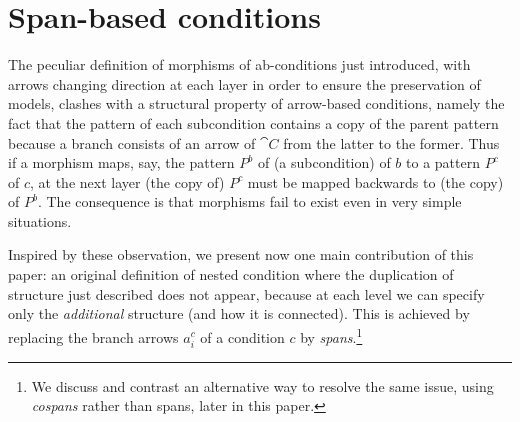 \section{Span-based conditions}

The peculiar definition of morphisms of ab-conditions just introduced, with arrows changing direction at each layer in order to ensure the preservation of models, clashes with a structural property of arrow-based conditions, namely the fact that the pattern of each subcondition contains a copy of the parent pattern because a branch consists of an arrow of $\cat{C}$ from the latter to the former. Thus if a morphism maps, say, the pattern $P^b$ of (a subcondition) of $b$ to a pattern $P^c$ of $c$, at the next layer (the copy of) $P^c$ must be mapped backwards to (the copy) of $P^b$. The consequence is that morphisms fail to exist even in very simple situations.
  
Inspired by these observation, we present now one main contribution of this paper: an original definition of nested condition where the duplication of structure just described does not appear, because at each level we can specify only the \emph{additional} structure (and how it is connected). This is achieved by replacing the branch arrows $a^c_i$ of a condition $c$ by \emph{spans}.\footnote{We discuss and contrast an alternative way to resolve the same issue, using \emph{cospans} rather than spans, later in this paper.}


